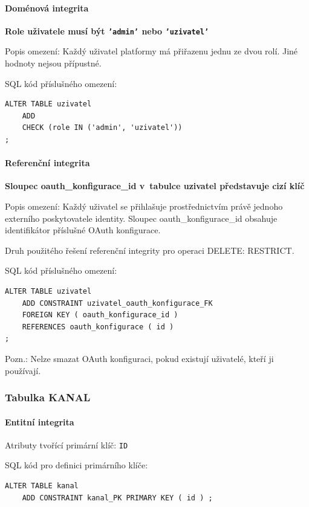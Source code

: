 \documentclass[12pt,a4paper]{article}
\begin{document}
\paragraph{Doménová integrita}

\textbf{Role uživatele musí být \texttt{'admin'} nebo \texttt{'uzivatel'}}

Popis omezení: Každý uživatel platformy má přiřazenu jednu ze dvou rolí. Jiné hodnoty
nejsou přípustné.

SQL kód příslušného omezení:
\begin{lstlisting}
ALTER TABLE uzivatel
    ADD
    CHECK (role IN ('admin', 'uzivatel'))
;
\end{lstlisting}

\paragraph{Referenční integrita}

\textbf{Sloupec oauth\_konfigurace\_id v~tabulce uzivatel představuje cizí klíč}

Popis omezení: Každý uživatel se přihlašuje prostřednictvím právě jednoho externího
poskytovatele identity. Sloupec oauth\_konfigurace\_id obsahuje identifikátor příslušné
OAuth konfigurace.

Druh použitého řešení referenční integrity pro operaci DELETE: RESTRICT.

SQL kód příslušného omezení:
\begin{lstlisting}
ALTER TABLE uzivatel
    ADD CONSTRAINT uzivatel_oauth_konfigurace_FK
    FOREIGN KEY ( oauth_konfigurace_id )
    REFERENCES oauth_konfigurace ( id )
;
\end{lstlisting}
Pozn.: Nelze smazat OAuth konfiguraci, pokud existují uživatelé, kteří ji používají.

\subsubsection{Tabulka KANAL}

\paragraph{Entitní integrita}
Atributy tvořící primární klíč: \texttt{ID}

SQL kód pro definici primárního klíče:
\begin{lstlisting}
ALTER TABLE kanal
    ADD CONSTRAINT kanal_PK PRIMARY KEY ( id ) ;
\end{lstlisting}
\end{document}
